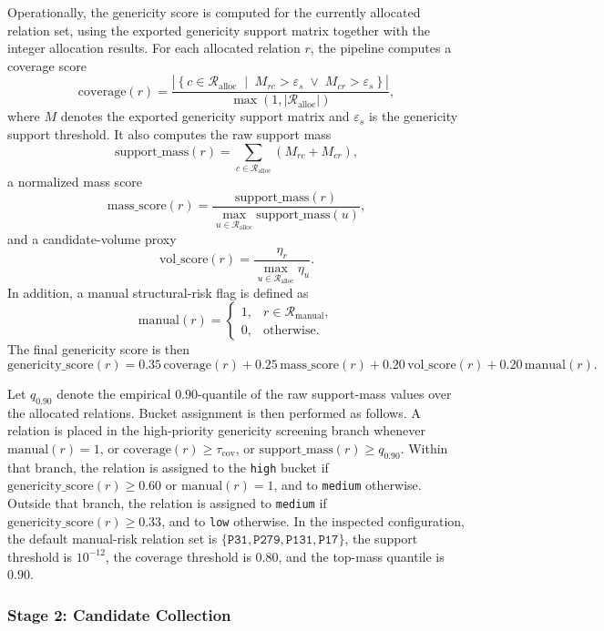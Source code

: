\documentclass[12pt,a4paper]{article}
\begin{document}
Operationally, the genericity score is computed for the currently allocated relation set, using the exported genericity support matrix together with the integer allocation results. For each allocated relation \(r\), the pipeline computes a coverage score
\[
\mathrm{coverage}(r)
=
\frac{
\left|
\left\{
c \in \mathcal{R}_{\mathrm{alloc}}
\;\middle|\;
M_{rc} > \varepsilon_s
\;\lor\;
M_{cr} > \varepsilon_s
\right\}
\right|
}{
\max(1, |\mathcal{R}_{\mathrm{alloc}}|)
},
\]
where \(M\) denotes the exported genericity support matrix and \(\varepsilon_s\) is the genericity support threshold. It also computes the raw support mass
\[
\mathrm{support\_mass}(r)
=
\sum_{c \in \mathcal{R}_{\mathrm{alloc}}} (M_{rc} + M_{cr}),
\]
a normalized mass score
\[
\mathrm{mass\_score}(r)
=
\frac{\mathrm{support\_mass}(r)}{\max_{u \in \mathcal{R}_{\mathrm{alloc}}} \mathrm{support\_mass}(u)},
\]
and a candidate-volume proxy
\[
\mathrm{vol\_score}(r)
=
\frac{\eta_r}{\max_{u \in \mathcal{R}_{\mathrm{alloc}}} \eta_u}.
\]
In addition, a manual structural-risk flag is defined as
\[
\mathrm{manual}(r)
=
\begin{cases}
1, & r \in \mathcal{R}_{\mathrm{manual}},\\
0, & \text{otherwise.}
\end{cases}
\]
The final genericity score is then
\[
\mathrm{genericity\_score}(r)
=
0.35\,\mathrm{coverage}(r)
+
0.25\,\mathrm{mass\_score}(r)
+
0.20\,\mathrm{vol\_score}(r)
+
0.20\,\mathrm{manual}(r).
\]

Let \(q_{0.90}\) denote the empirical \(0.90\)-quantile of the raw support-mass values over the allocated relations. Bucket assignment is then performed as follows. A relation is placed in the high-priority genericity screening branch whenever \(\mathrm{manual}(r)=1\), or \(\mathrm{coverage}(r)\ge \tau_{\mathrm{cov}}\), or \(\mathrm{support\_mass}(r)\ge q_{0.90}\). Within that branch, the relation is assigned to the \texttt{high} bucket if \(\mathrm{genericity\_score}(r)\ge 0.60\) or \(\mathrm{manual}(r)=1\), and to \texttt{medium} otherwise. Outside that branch, the relation is assigned to \texttt{medium} if \(\mathrm{genericity\_score}(r)\ge 0.33\), and to \texttt{low} otherwise. In the inspected configuration, the default manual-risk relation set is \(\{ \texttt{P31}, \texttt{P279}, \texttt{P131}, \texttt{P17} \}\), the support threshold is \(10^{-12}\), the coverage threshold is \(0.80\), and the top-mass quantile is \(0.90\).

\subsubsection{Stage 2: Candidate Collection}
\end{document}
